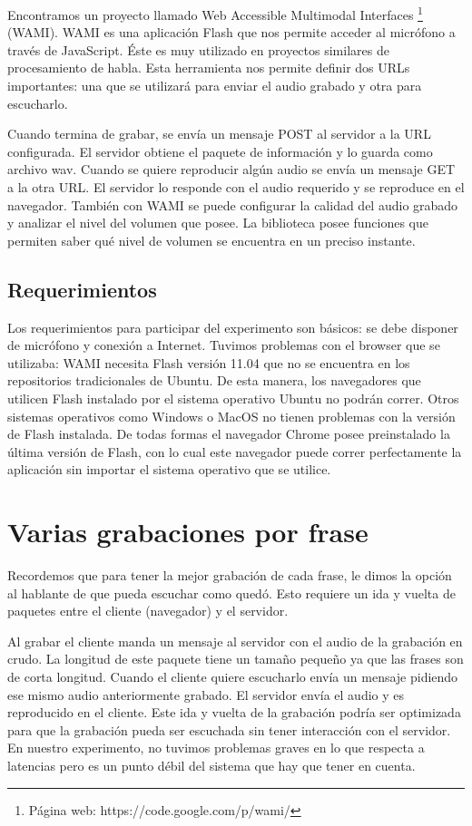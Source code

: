 Encontramos un proyecto llamado Web Accessible Multimodal Interfaces \footnote{Página web: https://code.google.com/p/wami/} (WAMI). WAMI es una aplicación Flash que nos permite acceder al micrófono a través de JavaScript. Éste es muy utilizado en proyectos similares de procesamiento de habla. Esta herramienta nos permite definir dos URLs importantes: una que se utilizará para enviar el audio grabado y otra para escucharlo.  

Cuando termina de grabar, se envía un mensaje POST al servidor a la URL configurada. El servidor obtiene el paquete de información y lo guarda como archivo wav. Cuando se quiere reproducir algún audio se envía un mensaje GET a la otra URL. El servidor lo responde con el audio requerido y se reproduce en el navegador. También con WAMI se puede configurar la calidad del audio grabado y analizar el nivel del volumen que posee. La biblioteca posee funciones que permiten saber qué nivel de volumen se encuentra en un preciso instante.

\subsection{Requerimientos}

Los requerimientos para participar del experimento son básicos: se debe disponer de micrófono y conexión a Internet. Tuvimos problemas con el browser que se utilizaba: WAMI necesita Flash versión 11.04 que no se encuentra en los repositorios tradicionales de Ubuntu. De esta manera, los navegadores que utilicen Flash instalado por el sistema operativo Ubuntu no podrán correr. Otros sistemas operativos como Windows o MacOS no tienen problemas con la versión de Flash instalada. De todas formas el navegador Chrome posee preinstalado la última versión de Flash, con lo cual este navegador puede correr perfectamente la aplicación sin importar el sistema operativo que se utilice.

\section{Varias grabaciones por frase}

Recordemos que para tener la mejor grabación de cada frase, le dimos la opción al hablante de que pueda escuchar como quedó. Esto requiere un ida y vuelta de paquetes entre el cliente (navegador) y el servidor. 

Al grabar el cliente manda un mensaje al servidor con el audio de la grabación en crudo. La longitud de este paquete tiene un tamaño pequeño ya que las frases son de corta longitud. Cuando el cliente quiere escucharlo envía un mensaje pidiendo ese mismo audio anteriormente grabado. El servidor envía el audio y es reproducido en el cliente. Este ida y vuelta de la grabación podría ser optimizada para que la grabación pueda ser escuchada sin tener interacción con el servidor. En nuestro experimento, no tuvimos problemas graves en lo que respecta a latencias pero es un punto débil del sistema que hay que tener en cuenta.

